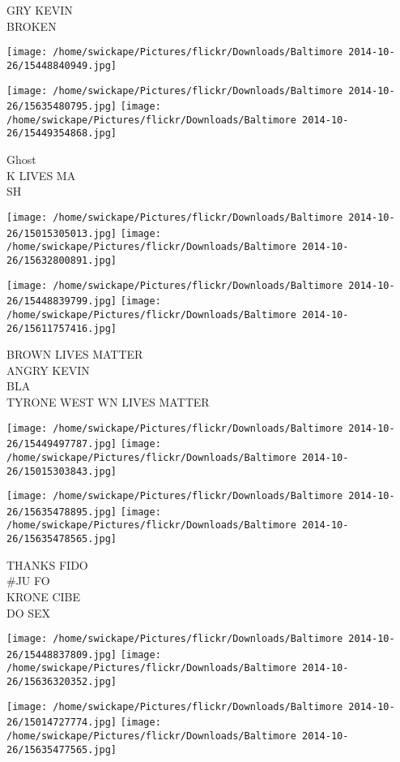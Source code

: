 \documentclass[10pt,letterpaper]{article}
\begin{document}
GRY KEVIN\\
BROKEN
\pagebreak

\texttt{[image: /home/swickape/Pictures/flickr/Downloads/Baltimore 2014-10-26/15448840949.jpg]}

\vspace{0.25in}
\texttt{[image: /home/swickape/Pictures/flickr/Downloads/Baltimore 2014-10-26/15635480795.jpg]}
\texttt{[image: /home/swickape/Pictures/flickr/Downloads/Baltimore 2014-10-26/15449354868.jpg]}

Ghost\\
K LIVES MA\\
SH
\pagebreak

\texttt{[image: /home/swickape/Pictures/flickr/Downloads/Baltimore 2014-10-26/15015305013.jpg]}
\texttt{[image: /home/swickape/Pictures/flickr/Downloads/Baltimore 2014-10-26/15632800891.jpg]}

\texttt{[image: /home/swickape/Pictures/flickr/Downloads/Baltimore 2014-10-26/15448839799.jpg]}
\texttt{[image: /home/swickape/Pictures/flickr/Downloads/Baltimore 2014-10-26/15611757416.jpg]}

BROWN LIVES MATTER\\
ANGRY KEVIN\\
BLA\\
TYRONE WEST WN LIVES MATTER
\pagebreak

\texttt{[image: /home/swickape/Pictures/flickr/Downloads/Baltimore 2014-10-26/15449497787.jpg]}
\texttt{[image: /home/swickape/Pictures/flickr/Downloads/Baltimore 2014-10-26/15015303843.jpg]}

\texttt{[image: /home/swickape/Pictures/flickr/Downloads/Baltimore 2014-10-26/15635478895.jpg]}
\texttt{[image: /home/swickape/Pictures/flickr/Downloads/Baltimore 2014-10-26/15635478565.jpg]}

THANKS FIDO\\
\#JU FO\\
KRONE CIBE\\
DO SEX
\pagebreak

\texttt{[image: /home/swickape/Pictures/flickr/Downloads/Baltimore 2014-10-26/15448837809.jpg]}
\texttt{[image: /home/swickape/Pictures/flickr/Downloads/Baltimore 2014-10-26/15636320352.jpg]}

\texttt{[image: /home/swickape/Pictures/flickr/Downloads/Baltimore 2014-10-26/15014727774.jpg]}
\texttt{[image: /home/swickape/Pictures/flickr/Downloads/Baltimore 2014-10-26/15635477565.jpg]}
\end{document}
